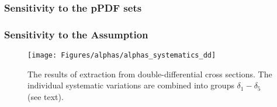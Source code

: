 \subsubsection{Sensitivity to the pPDF sets}
\label{subsec:aspdfassump}

\subsubsection{Sensitivity to the \asz Assumption}
\label{subsec:asassump}

\begin{figure}
 \centering
 \texttt{[image: Figures/alphas/alphas\_systematics\_dd]}
 \caption{The results of \asz extraction from double-differential cross sections. The individual systematic variations are combined into groups $\delta_1-\delta_5$ (see text).}
 \label{fig:asthunc_dd}
\end{figure}
